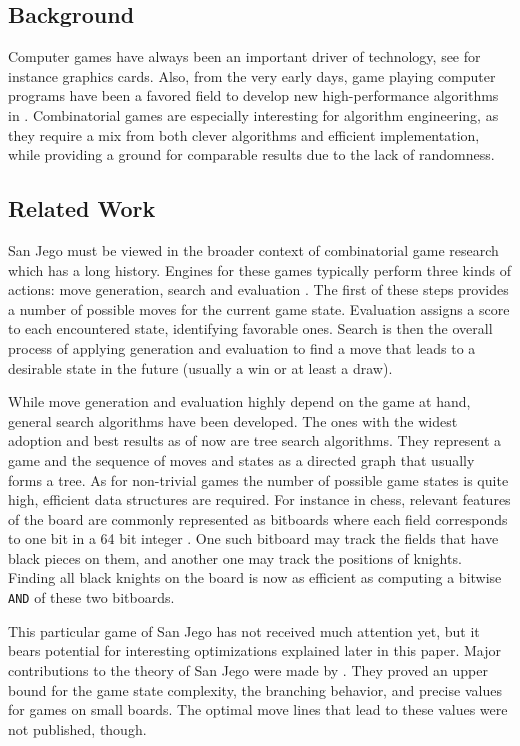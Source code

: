 \documentclass[sigconf]{acmart}
\begin{document}
\subsection{Background}
Computer games have always been an important driver of technology, see for instance graphics cards.
Also, from the very early days, game playing computer programs have been a favored field to develop new high-performance algorithms in \cite{Shannon1950}.
Combinatorial games are especially interesting for algorithm engineering, as they require a mix from both clever algorithms and efficient implementation, while providing a ground for comparable results due to the lack of randomness.

\subsection{Related Work}
San Jego must be viewed in the broader context of combinatorial game research which has a long history.
Engines for these games typically perform three kinds of actions: move generation, search and evaluation \cite{Bimonugroho2020}.
The first of these steps provides a number of possible moves for the current game state.
Evaluation assigns a score to each encountered state, identifying favorable ones.
Search is then the overall process of applying generation and evaluation to find a move that leads to a desirable state in the future (usually a win or at least a draw).

While move generation and evaluation highly depend on the game at hand, general search algorithms have been developed.
The ones with the widest adoption and best results as of now are tree search algorithms.
They represent a game and the sequence of moves and states as a directed graph that usually forms a tree.
As for non-trivial games the number of possible game states is quite high, efficient data structures are required.
For instance in chess, relevant features of the board are commonly represented as bitboards where each field corresponds to one bit in a 64 bit integer \cite{Bimonugroho2020}.
One such bitboard may track the fields that have black pieces on them, and another one may track the positions of knights.
Finding all black knights on the board is now as efficient as computing a bitwise \texttt{AND} of these two bitboards.

This particular game of San Jego has not received much attention yet, but it bears potential for interesting optimizations explained later in this paper.
Major contributions to the theory of San Jego were made by \citeauthor{Althöfer2020} \cite{Althöfer2020}.
They proved an upper bound for the game state complexity, the branching behavior, and precise values for games on small boards.
The optimal move lines that lead to these values were not published, though.
\end{document}
